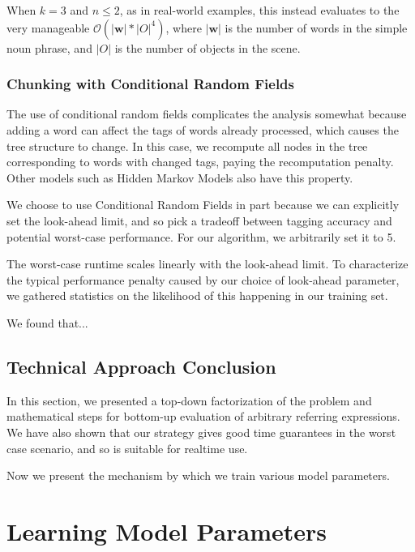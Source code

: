 \documentclass[letterpaper,10pt]{article}
\begin{document}
When $k = 3$ and $n \leq 2$, as in real-world examples, this instead evaluates to the very manageable $\mathcal{O}(|\bm w| * |O|^{4})$, where $|\bm w|$ is the number of words in the simple noun phrase, and $|O|$ is the number of objects in the scene.

\subsubsection{Chunking with Conditional Random Fields}

The use of conditional random fields complicates the analysis somewhat because adding a word can affect the tags of words already processed, which causes the tree structure to change. In this case, we recompute all nodes in the tree corresponding to words with changed tags, paying the recomputation penalty. Other models such as Hidden Markov Models also have this property.

We choose to use Conditional Random Fields in part because we can explicitly set the look-ahead limit, and so pick a tradeoff between tagging accuracy and potential worst-case performance. For our algorithm, we arbitrarily set it to 5.

The worst-case runtime scales linearly with the look-ahead limit. To characterize the typical performance penalty caused by our choice of look-ahead parameter, we gathered statistics on the likelihood of this happening in our training set.

We found that...


\subsection{Technical Approach Conclusion}

In this section, we presented a top-down factorization of the problem and mathematical steps for bottom-up evaluation of arbitrary referring expressions. We have also shown that our strategy gives good time guarantees in the worst case scenario, and so is suitable for realtime use.

Now we present the mechanism by which we train various model parameters.

\section{Learning Model Parameters} 
\end{document}
